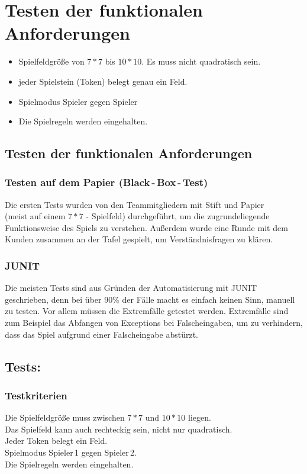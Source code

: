 \documentclass[a4paper, 12pt]{article}
\begin{document}
	\section{Testen der funktionalen Anforderungen}
	\begin{itemize}
		\item Spielfeldgröße von $7*7$ bis $10*10$. Es muss nicht quadratisch sein.
		\item jeder Spielstein (Token) belegt genau ein Feld.
		\item Spielmodus Spieler gegen Spieler
		\item Die Spielregeln werden eingehalten.
	\end{itemize}
	
	\pagebreak
	
	\subsection{Testen der funktionalen Anforderungen}
	\subsubsection{Testen auf dem Papier (Black\,-\,Box\,-\,Test)}
	Die ersten Tests wurden von den Teammitgliedern mit Stift und Papier \\
	(meist auf einem $7*7$ - Spielfeld) durchgeführt, um die zugrundeliegende Funktionsweise	
	des Spiels zu verstehen. Außerdem wurde eine Runde mit dem Kunden zusammen an der Tafel gespielt, 
	um Verständnisfragen zu klären.
	
	\subsubsection{JUNIT}
	Die meisten Tests sind aus Gründen der Automatisierung mit JUNIT geschrieben, denn bei über 90\% der Fälle
	macht es einfach keinen Sinn, manuell zu testen.\newline
	Vor allem müssen die Extremfälle getestet werden. Extremfälle sind zum Beispiel das Abfangen von 
	Exceptions bei Falscheingaben, um zu verhindern, dass das Spiel aufgrund einer Falscheingabe abstürzt. 
	
	\subsection{Tests: }
	\subsubsection{Testkriterien}
	Die Spielfeldgröße muss zwischen $7*7$ und $10*10$ liegen.\\
	Das Spielfeld kann auch rechteckig sein, nicht nur quadratisch.\\
	Jeder Token belegt ein Feld.\\
	Spielmodus Spieler\,1 gegen Spieler\,2.\\
	Die Spielregeln werden eingehalten.\\
	
\end{document}
